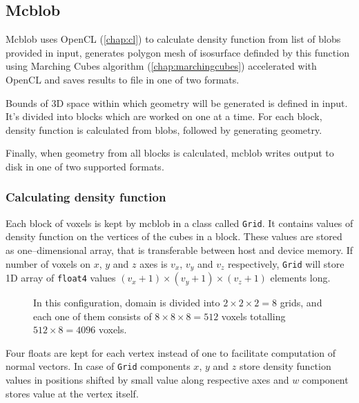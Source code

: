 \subsection{Mcblob}
\label{sub:mcblob}

Mcblob uses OpenCL (\autoref{chap:cl}) to calculate density function from
list of blobs provided in input, generates polygon mesh of isosurface
definded by this function using Marching Cubes algorithm (\autoref{chap:marchingcubes})
accelerated with OpenCL and saves results to file in one of two formats.

Bounds of 3D space within which geometry will be generated is defined in input.
It's divided into blocks which are worked on one at a time. For each block,
density function is calculated from blobs, followed by generating geometry.

Finally, when geometry from all blocks is calculated, mcblob writes output to
disk in one of two supported formats.

\subsubsection{Calculating density function}

Each block of voxels is kept by mcblob in a class called \texttt{Grid}. It
contains values of density function on the vertices of the cubes in a block.
These values are stored as one--dimensional array, that is transferable between host and
device memory. If number of voxels on $x$, $y$ and $z$ axes is $v_x$, $v_y$
and $v_z$ respectively, \texttt{Grid} will store 1D array
of \texttt{float4} values $(v_x+1)\times(v_y+1)\times(v_z+1)$ elements long.

\begin{figure}[tb]
  \begin{center}
    
  \end{center}
  \caption{In this configuration, domain is divided into $2\times2\times2=8$
  grids, and each one of them consists of $8\times8\times8=512$ voxels totalling
 $512\times8=4096$ voxels.}
  \label{fig:grid}
\end{figure}

Four floats are kept for each vertex instead of one to facilitate computation of
normal vectors. In case of \texttt{Grid} components $x$, $y$ and
$z$ store density function values in positions shifted by small value along
respective axes and $w$ component stores value at the vertex itself.

